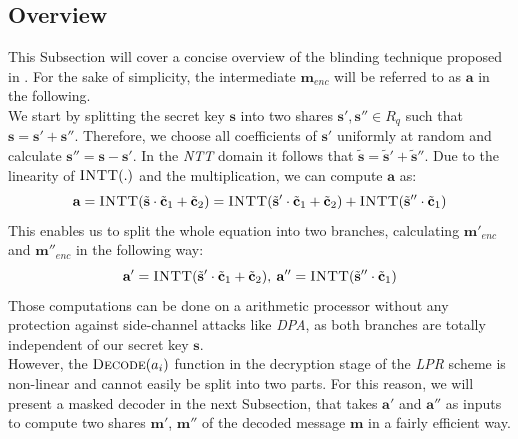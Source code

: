 \subsection{Overview}
This Subsection will cover a concise overview of the blinding technique proposed in \cite{maskedRing}. For the sake of simplicity, the intermediate \(\textbf{m}_{enc}\) will be referred to as \(\textbf{a}\) in the following.\\
We start by splitting the secret key \(\textbf{s}\) into two shares \(\textbf{s}',\textbf{s}'' \in R_q\) such that \(\textbf{s}=\textbf{s}'+\textbf{s}''\). Therefore, we choose all coefficients of \(\textbf{s}'\) uniformly at random and calculate \(\textbf{s}''=\textbf{s}-\textbf{s}'\). In the \textit{\ac{NTT}} domain it follows that \(\tilde{\textbf{s}}=\tilde{\textbf{s}}'+\tilde{\textbf{s}}''\). Due to the linearity of \(\textsc{INTT}(.)\) and the multiplication, we can compute \(\textbf{a}\) as:
\begin{equation}
	\textbf{a}=\textsc{INTT}(\tilde{\textbf{s}} \cdot \tilde{\textbf{c}}_1+\tilde{\textbf{c}}_2)=\textsc{INTT}(\tilde{\textbf{s}}' \cdot \tilde{\textbf{c}}_1+\tilde{\textbf{c}}_2)+\textsc{INTT}(\tilde{\textbf{s}}'' \cdot \tilde{\textbf{c}}_1)
\end{equation}
This enables us to split the whole equation into two branches, calculating \(\textbf{m}'_{enc}\) and \(\textbf{m}''_{enc}\) in the following way:
\begin{equation}
	\textbf{a}'=\textsc{INTT}(\tilde{\textbf{s}}' \cdot \tilde{\textbf{c}}_1+\tilde{\textbf{c}}_2),\:\textbf{a}''=\textsc{INTT}(\tilde{\textbf{s}}'' \cdot \tilde{\textbf{c}}_1)
\end{equation}
Those computations can be done on a arithmetic processor without any protection against side-channel attacks like \textit{\ac{DPA}}, as both branches are totally independent of our secret key \(\textbf{s}\).\\
However, the \(\textsc{Decode}(a_{i})\) function in the decryption stage of the \textit{\ac{LPR}} scheme is non-linear and cannot easily be split into two parts. For this reason, we will present a masked decoder in the next Subsection, that takes \(\textbf{a}'\) and \(\textbf{a}''\) as inputs to compute two shares \(\textbf{m}'\), \(\textbf{m}''\) of the decoded message \(\textbf{m}\) in a fairly efficient way.

